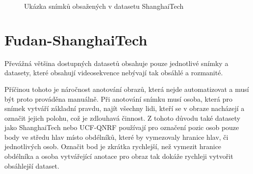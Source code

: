 \begin{figure}[h!]
	\centering
	\caption{Ukázka snímků obsažených v datasetu ShanghaiTech \cite{ShanghaiTech}}
	\label{fig:SH_TECH}
\end{figure}


\section{Fudan-ShanghaiTech}
Převážná většina dostupných datasetů obsahuje pouze jednotlivé snímky a datasety, které obsahují videosekvence nebývají tak obsáhlé a rozmanité.

Příčinou tohoto je náročnost anotování obrazů, která nejde automatizovat a musí být proto prováděna manuálně.
Při anotování snímku musí osoba, která pro snímek vytváří základní pravdu, najít všechny lidi, kteří se v obraze nacházejí a označit jejich polohu, což je zdlouhavá činnost.
Z tohoto důvodu také datasety jako ShanghaiTech nebo UCF-QNRF používají pro označení pozic osob pouze body ve středu hlav místo obdélníků, které by vymezovaly hranice hlav, či jednotlivých osob.
Označit bod je zkrátka rychlejší, než vymezit hranice obdélníka a osoba vytvářející anotace pro obraz tak dokáže rychleji vytvořit obsáhlejší dataset.

